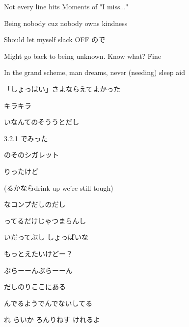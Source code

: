 \documentclass[a4paper,tate,twocolumn,12pt]{ltjtarticle}
\begin{document}
\begin{flushleft}
\begin{minipage}{\linewidth}
Not every line hits Moments of "I miss..."

Being nobody cuz nobody owns kindness

Should let myself slack OFF ので

Might go back to being unknown. Know what? Fine

In the grand scheme, man dreams, never (needing) sleep aid

「しょっぱい」さよならえてよかった

キラキラ
\end{minipage}

\vspace{2em}

\noindent\begin{minipage}{\linewidth}
いなんてのそううとだし

3.2.1 でみった

のそのシガレット

りったけど

(るかならdrink up we're still tough)

なコンプだしのだし

ってるだけじゃつまらんし

いだってぶし しょっぱいな

もっとえたいけどー？
\end{minipage}

\vspace{2em}

\noindent\begin{minipage}{\linewidth}
ぶらーーんぶらーーん
\end{minipage}

\vspace{2em}

\noindent\begin{minipage}{\linewidth}
だしのりここにある

んでるようでんでないしてる

れ らいか ろんりねす けれるよ


\end{minipage}
\end{flushleft}
\end{document}

